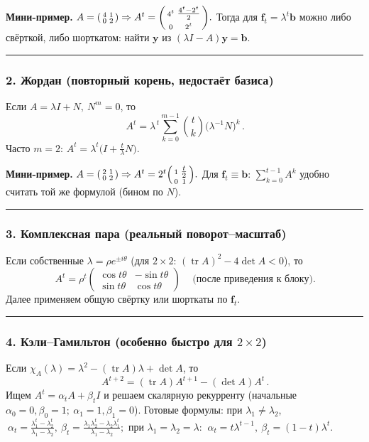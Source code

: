 \textbf{Мини-пример.} \(A=\begin{psmallmatrix}4&1\\0&2\end{psmallmatrix}\Rightarrow
A^t=\begin{psmallmatrix}4^t&\tfrac{4^t-2^t}{2}\\[2pt]0&2^t\end{psmallmatrix}.\)
Тогда для \(\mathbf{f}_t=\lambda^t\mathbf{b}\) можно либо свёрткой, либо шорткатом: найти \(\mathbf{y}\) из \((\lambda I-A)\mathbf{y}=\mathbf{b}\).

\bigskip\hrule\bigskip

\subsubsection*{2. Жордан (повторный корень, недостаёт базиса)}
Если \(A=\lambda I+N,\ N^m=0\), то
\[
\boxed{\,A^t=\lambda^{\,t}\sum_{k=0}^{m-1}\binom{t}{k}\big(\lambda^{-1}N\big)^k\,}.
\]
Часто \(m=2\): \(A^t=\lambda^t\big(I+\tfrac{t}{\lambda}N\big)\).

\textbf{Мини-пример.} \(A=\begin{psmallmatrix}2&1\\0&2\end{psmallmatrix}\Rightarrow A^t=2^t\begin{psmallmatrix}1&\tfrac t2\\0&1\end{psmallmatrix}.\)
Для \(\mathbf{f}_t\equiv\mathbf{b}\): \(\sum_{k=0}^{t-1}A^k\) удобно считать той же формулой (бином по \(N\)).

\bigskip\hrule\bigskip

\subsubsection*{3. Комплексная пара (реальный поворот–масштаб)}
Если собственные \(\lambda=\rho e^{\pm i\theta}\) (для \(2\times2\): \((\operatorname{tr}A)^2-4\det A<0\)), то
\[
\boxed{\,A^t=\rho^t\begin{pmatrix}\cos t\theta&-\sin t\theta\\ \sin t\theta&\cos t\theta\end{pmatrix}\,}
\quad\text{(после приведения к блоку)}.
\]
Далее применяем общую свёртку или шорткаты по \(\mathbf{f}_t\).

\bigskip\hrule\bigskip

\subsubsection*{4. Кэли–Гамильтон (особенно быстро для \(2\times2\))}
Если \(\chi_A(\lambda)=\lambda^2-(\operatorname{tr}A)\lambda+\det A\), то
\[
\boxed{\,A^{t+2}=(\operatorname{tr}A)A^{t+1}-(\det A)A^{t}\,}.
\]
Ищем \(A^t=\alpha_t A+\beta_t I\) и решаем скалярную рекурренту (начальные \(\alpha_0{=}0,\beta_0{=}1;\ \alpha_1{=}1,\beta_1{=}0\)).
Готовые формулы: при \(\lambda_{1}\neq\lambda_{2}\),
\(\ \alpha_t=\frac{\lambda_1^t-\lambda_2^t}{\lambda_1-\lambda_2},\
\beta_t=\frac{\lambda_1\lambda_2^t-\lambda_2\lambda_1^t}{\lambda_1-\lambda_2};\)
при \(\lambda_1=\lambda_2=\lambda\): \(\ \alpha_t=t\lambda^{t-1},\ \beta_t=(1-t)\lambda^t.\)


